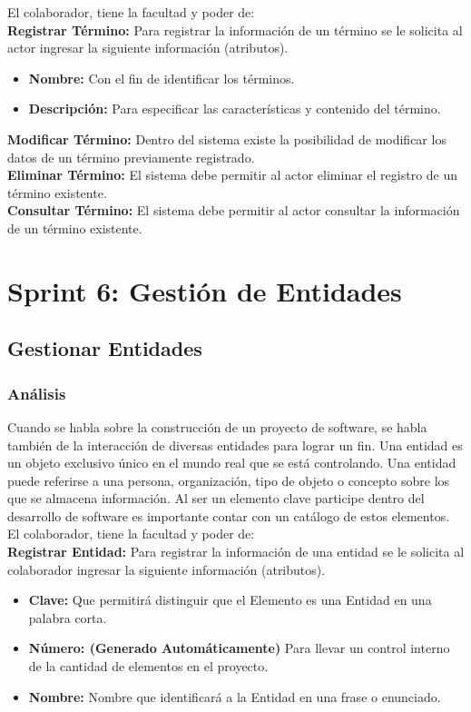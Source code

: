 El colaborador, tiene la facultad y poder de:\\

\textbf {Registrar Término:}
Para registrar la información de un término se le solicita al actor ingresar la siguiente información (atributos).
\begin{itemize}
	\item \textbf{Nombre:} Con el fin de identificar los términos.
	\item \textbf{Descripción:} Para especificar las características y contenido del término.
\end{itemize}

\textbf {Modificar Término:}
Dentro del sistema existe la posibilidad de modificar los datos de un término previamente registrado.\\

\textbf {Eliminar Término:} 
El sistema debe permitir al actor eliminar el registro de un término existente.\\

\textbf {Consultar Término:} 
El sistema debe permitir al actor consultar la información de un término existente.

\newpage

\section{Sprint 6: Gestión de Entidades}
\subsection{Gestionar Entidades}

\subsubsection {Análisis}
Cuando se habla sobre la construcción de un proyecto de software, se habla también de la interacción de diversas entidades para lograr un fin. Una entidad es un objeto exclusivo único en el mundo real que se está controlando. Una entidad puede referirse a una persona, organización, tipo de objeto o concepto sobre los que se almacena información. Al ser un elemento clave participe dentro del desarrollo de software es importante contar con un catálogo de estos elementos.\\

El colaborador, tiene la facultad y poder de:\\

\textbf {Registrar Entidad:}
Para registrar la información de una entidad se le solicita al colaborador ingresar la siguiente información (atributos).
\begin{itemize}
	\item \textbf{Clave:} Que permitirá distinguir que el Elemento es una Entidad en una palabra corta.
	\item \textbf{Número: (Generado Automáticamente)} Para llevar un control interno de la cantidad de elementos en el proyecto.
	\item \textbf{Nombre:} Nombre que identificará a la Entidad en una frase o enunciado.
\end{itemize}

